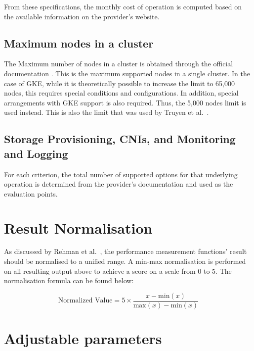 From these specifications, the monthly cost of operation is computed
based on the available information on the provider's website.

\subsection{Maximum nodes in a cluster}\label{maximum-nodes-in-a-cluster}

The Maximum number of nodes in a cluster is obtained through the
official documentation
\cite{Chapter4Planninga,KnownLimitsService,nickomangLimitsResourcesSKUs2024,QuotasLimitsGoogle}.
This is the maximum supported nodes in a single cluster. In the case of
GKE, while it is theoretically possible to increase the limit to 65,000
nodes, this requires special conditions and configurations. In addition,
special arrangements with GKE support is also required. Thus, the 5,000
nodes limit is used instead. This is also the limit that was used by
Truyen et al.~\cite{truyenManagingFeatureCompatibility2020}.

\subsection{Storage Provisioning, CNIs, and Monitoring and
Logging}\label{storage-provisioning-cnis-and-monitoring-and-logging}

For each criterion, the total number of supported options for that
underlying operation is determined from the provider's documentation and used as the evaluation points. 

\section{Result Normalisation}\label{result-normalisation}

As discussed by Rehman et al.~\cite{5976164}, the performance
measurement functions' result should be normalised to a unified range. A
min-max normalisation is performed on all resulting output above to
achieve a score on a scale from 0 to 5. The normalisation formula can be
found below:

\[
   \text{Normalized Value} = 5 \times \frac{x - \text{min}(x)}{\text{max}(x) - \text{min}(x)}
\]

\section{Adjustable parameters}\label{adjustable-parameters}

